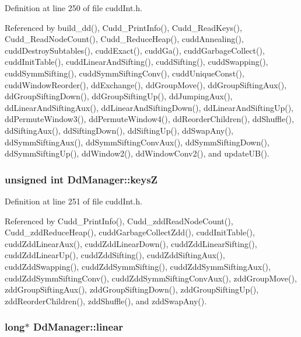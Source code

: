 Definition at line 250 of file cudd\-Int.h.

Referenced by build\_\-dd(), Cudd\_\-Print\-Info(), Cudd\_\-Read\-Keys(), Cudd\_\-Read\-Node\-Count(), Cudd\_\-Reduce\-Heap(), cudd\-Annealing(), cudd\-Destroy\-Subtables(), cudd\-Exact(), cudd\-Ga(), cudd\-Garbage\-Collect(), cudd\-Init\-Table(), cudd\-Linear\-And\-Sifting(), cudd\-Sifting(), cudd\-Swapping(), cudd\-Symm\-Sifting(), cudd\-Symm\-Sifting\-Conv(), cudd\-Unique\-Const(), cudd\-Window\-Reorder(), dd\-Exchange(), dd\-Group\-Move(), dd\-Group\-Sifting\-Aux(), dd\-Group\-Sifting\-Down(), dd\-Group\-Sifting\-Up(), dd\-Jumping\-Aux(), dd\-Linear\-And\-Sifting\-Aux(), dd\-Linear\-And\-Sifting\-Down(), dd\-Linear\-And\-Sifting\-Up(), dd\-Permute\-Window3(), dd\-Permute\-Window4(), dd\-Reorder\-Children(), dd\-Shuffle(), dd\-Sifting\-Aux(), dd\-Sifting\-Down(), dd\-Sifting\-Up(), dd\-Swap\-Any(), dd\-Symm\-Sifting\-Aux(), dd\-Symm\-Sifting\-Conv\-Aux(), dd\-Symm\-Sifting\-Down(), dd\-Symm\-Sifting\-Up(), dd\-Window2(), dd\-Window\-Conv2(), and update\-UB().
\subsubsection{\setlength{\rightskip}{0pt plus 5cm}unsigned int \bf{Dd\-Manager::keys\-Z}}\label{structDdManager_84e69eadfd3165e15ccfd21c6821131d}




Definition at line 251 of file cudd\-Int.h.

Referenced by Cudd\_\-Print\-Info(), Cudd\_\-zdd\-Read\-Node\-Count(), Cudd\_\-zdd\-Reduce\-Heap(), cudd\-Garbage\-Collect\-Zdd(), cudd\-Init\-Table(), cudd\-Zdd\-Linear\-Aux(), cudd\-Zdd\-Linear\-Down(), cudd\-Zdd\-Linear\-Sifting(), cudd\-Zdd\-Linear\-Up(), cudd\-Zdd\-Sifting(), cudd\-Zdd\-Sifting\-Aux(), cudd\-Zdd\-Swapping(), cudd\-Zdd\-Symm\-Sifting(), cudd\-Zdd\-Symm\-Sifting\-Aux(), cudd\-Zdd\-Symm\-Sifting\-Conv(), cudd\-Zdd\-Symm\-Sifting\-Conv\-Aux(), zdd\-Group\-Move(), zdd\-Group\-Sifting\-Aux(), zdd\-Group\-Sifting\-Down(), zdd\-Group\-Sifting\-Up(), zdd\-Reorder\-Children(), zdd\-Shuffle(), and zdd\-Swap\-Any().
\subsubsection{\setlength{\rightskip}{0pt plus 5cm}long$\ast$ \bf{Dd\-Manager::linear}}\label{structDdManager_bb16be124b8b6ad5ca2cba0a7b94752b}




